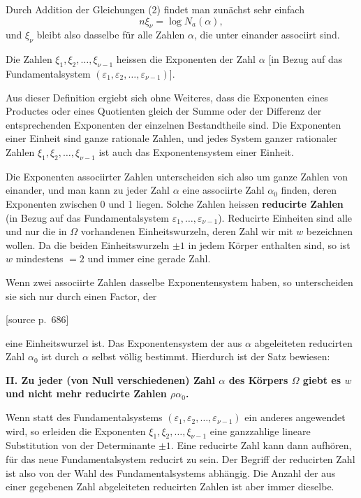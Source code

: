 \documentclass[11pt]{article}
\newcommand{\Na}{N_a}
\newcommand{\srcpage}[1]{\par\medskip\noindent\textsf{[source p.~#1]}\par\smallskip}
\begin{document}
Durch Addition der Gleichungen (2) findet man zunächst sehr einfach
\begin{equation}
n\xi_\nu=\log \Na(\alpha),
\tag{4}
\end{equation}
und $\xi_\nu$ bleibt also dasselbe für alle Zahlen $\alpha$, die unter einander associirt sind.

Die Zahlen $\xi_1,\xi_2,\ldots,\xi_{\nu-1}$ heissen die Exponenten der Zahl $\alpha$ [in Bezug auf das Fundamentalsystem $(\varepsilon_1,\varepsilon_2,\ldots,\varepsilon_{\nu-1})$].

Aus dieser Definition ergiebt sich ohne Weiteres, dass die Exponenten eines Productes oder eines Quotienten gleich der Summe oder der Differenz der entsprechenden Exponenten der einzelnen Bestandtheile sind. Die Exponenten einer Einheit sind ganze rationale Zahlen, und jedes System ganzer rationaler Zahlen $\xi_1,\xi_2,\ldots,\xi_{\nu-1}$ ist auch das Exponentensystem einer Einheit.

Die Exponenten associirter Zahlen unterscheiden sich also um ganze Zahlen von einander, und man kann zu jeder Zahl $\alpha$ eine associirte Zahl $\alpha_0$ finden, deren Exponenten zwischen 0 und 1 liegen. Solche Zahlen heissen \textbf{reducirte Zahlen} (in Bezug auf das Fundamentalsystem $\varepsilon_1,\ldots,\varepsilon_{\nu-1}$). Reducirte Einheiten sind alle und nur die in $\Omega$ vorhandenen Einheitswurzeln, deren Zahl wir mit $w$ bezeichnen wollen. Da die beiden Einheitswurzeln $\pm1$ in jedem Körper enthalten sind, so ist $w$ mindestens $=2$ und immer eine gerade Zahl.

Wenn zwei associirte Zahlen dasselbe Exponentensystem haben, so unterscheiden sie sich nur durch einen Factor, der

\srcpage{686}
eine Einheitswurzel ist. Das Exponentensystem der aus $\alpha$ abgeleiteten reducirten Zahl $\alpha_0$ ist durch $\alpha$ selbst völlig bestimmt. Hierdurch ist der Satz bewiesen:

\begin{center}
\textbf{II. Zu jeder (von Null verschiedenen) Zahl $\alpha$ des Körpers $\Omega$ giebt es $w$ und nicht mehr reducirte Zahlen $\rho\alpha_0$.}
\end{center}

Wenn statt des Fundamentalsystems $(\varepsilon_1,\varepsilon_2,\ldots,\varepsilon_{\nu-1})$ ein anderes angewendet wird, so erleiden die Exponenten $\xi_1,\xi_2,\ldots,\xi_{\nu-1}$ eine ganzzahlige lineare Substitution von der Determinante $\pm1$. Eine reducirte Zahl kann dann aufhören, für das neue Fundamentalsystem reducirt zu sein. Der Begriff der reducirten Zahl ist also von der Wahl des Fundamentalsystems abhängig. Die Anzahl der aus einer gegebenen Zahl abgeleiteten reducirten Zahlen ist aber immer dieselbe.
\end{document}
